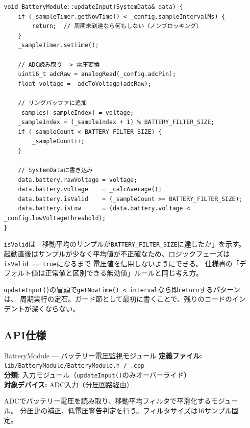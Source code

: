 \begin{lstlisting}[style=cppstyle, caption={BatteryModule.cpp — updateInput()}]
void BatteryModule::updateInput(SystemData& data) {
    if (_sampleTimer.getNowTime() < _config.sampleIntervalMs) {
        return;  // 周期未到達なら何もしない（ノンブロッキング）
    }
    _sampleTimer.setTime();

    // ADC読み取り -> 電圧変換
    uint16_t adcRaw = analogRead(_config.adcPin);
    float voltage = _adcToVoltage(adcRaw);

    // リングバッファに追加
    _samples[_sampleIndex] = voltage;
    _sampleIndex = (_sampleIndex + 1) % BATTERY_FILTER_SIZE;
    if (_sampleCount < BATTERY_FILTER_SIZE) {
        _sampleCount++;
    }

    // SystemDataに書き込み
    data.battery.rawVoltage = voltage;
    data.battery.voltage    = _calcAverage();
    data.battery.isValid    = (_sampleCount >= BATTERY_FILTER_SIZE);
    data.battery.isLow      = (data.battery.voltage < _config.lowVoltageThreshold);
}
\end{lstlisting}

\begin{pointbox}[isValidの使い方]
\texttt{isValid}は「移動平均のサンプルが\texttt{BATTERY\_FILTER\_SIZE}に達したか」を示す。
起動直後はサンプルが少なく平均値が不正確なため、ロジックフェーズは\texttt{isValid == true}になるまで
電圧値を信用しないようにできる。
仕様書の「デフォルト値は正常値と区別できる無効値」ルールと同じ考え方。
\end{pointbox}

\begin{pointbox}[周期サンプリングの定石]
\texttt{updateInput()}の冒頭で\texttt{getNowTime() < interval}なら即\texttt{return}するパターンは、
周期実行の定石。ガード節として最初に書くことで、残りのコードのインデントが深くならない。
\end{pointbox}

\subsection{API仕様}


\begin{apibox}{BatteryModule --- バッテリー電圧監視モジュール}
\textbf{定義ファイル:} \texttt{lib/BatteryModule/BatteryModule.h / .cpp}\\
\textbf{分類:} 入力モジュール（\texttt{updateInput()}のみオーバーライド）\\
\textbf{対象デバイス:} ADC入力（分圧回路経由）

ADCでバッテリー電圧を読み取り、移動平均フィルタで平滑化するモジュール。
分圧比の補正、低電圧警告判定を行う。フィルタサイズは16サンプル固定。
\end{apibox}

